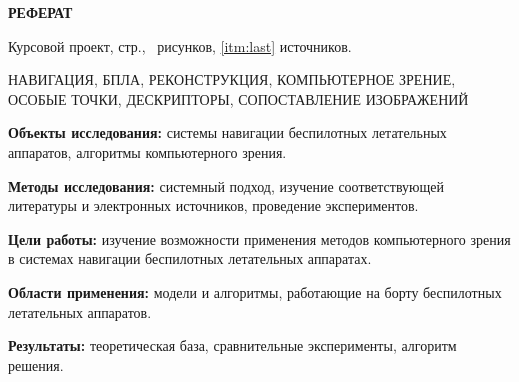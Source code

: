\begin{center}
  \large\bfseries{РЕФЕРАТ}
\end{center}

Курсовой проект, \pageref{LastPage} стр., \totalfigures\ рисунков, \ref{itm:last} источников.

\begin{center}
  \large{НАВИГАЦИЯ, БПЛА, РЕКОНСТРУКЦИЯ, КОМПЬЮТЕРНОЕ ЗРЕНИЕ, ОСОБЫЕ ТОЧКИ, ДЕСКРИПТОРЫ, СОПОСТАВЛЕНИЕ ИЗОБРАЖЕНИЙ}
\end{center}

\textbf{Объекты исследования:} системы навигации беспилотных летательных аппаратов, алгоритмы компьютерного зрения.

\textbf{Методы исследования:} системный подход, изучение соответствующей литературы и электронных источников, проведение экспериментов.

\textbf{Цели работы:} изучение возможности применения методов компьютерного зрения в системах навигации беспилотных летательных аппаратах.

\textbf{Области применения:} модели и алгоритмы, работающие на борту беспилотных летательных аппаратов.

\textbf{Результаты:} теоретическая база, сравнительные эксперименты, алгоритм решения.

\newpage
